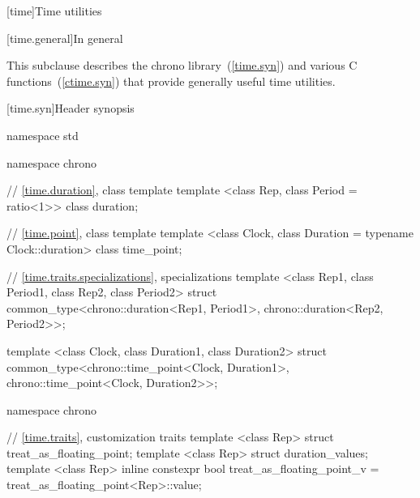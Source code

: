 [time]{Time utilities}

[time.general]{In general}

\pnum
{}%
This subclause describes the chrono library~(\ref{time.syn}) and various C
functions~(\ref{ctime.syn}) that provide generally useful time
utilities.

[time.syn]{Header  synopsis}

%
%
\begin{codeblock}
namespace std {
  namespace chrono {
    // \ref{time.duration}, class template 
    template <class Rep, class Period = ratio<1>> class duration;

    // \ref{time.point}, class template 
    template <class Clock, class Duration = typename Clock::duration> class time_point;
  }

  // \ref{time.traits.specializations},  specializations
  template <class Rep1, class Period1, class Rep2, class Period2>
    struct common_type<chrono::duration<Rep1, Period1>,
                       chrono::duration<Rep2, Period2>>;

  template <class Clock, class Duration1, class Duration2>
    struct common_type<chrono::time_point<Clock, Duration1>,
                       chrono::time_point<Clock, Duration2>>;

  namespace chrono {
    // \ref{time.traits}, customization traits
    template <class Rep> struct treat_as_floating_point;
    template <class Rep> struct duration_values;
    template <class Rep> inline constexpr bool treat_as_floating_point_v
      = treat_as_floating_point<Rep>::value;

}}
\end{codeblock}
